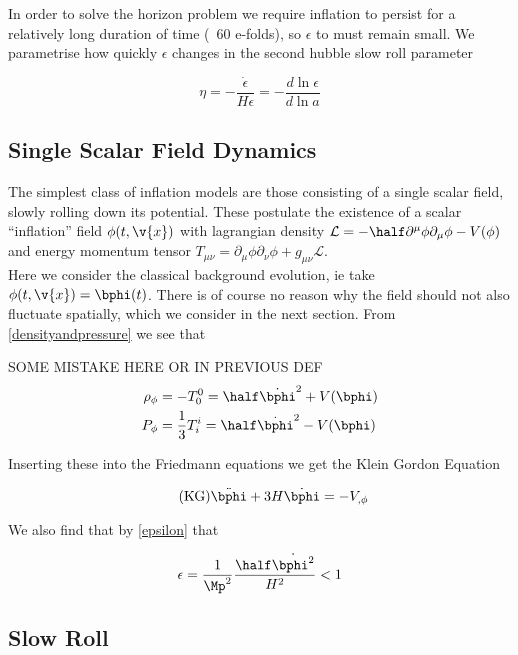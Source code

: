 In order to solve the horizon problem we require inflation to persist for a relatively long duration of time (~60 e-folds), so $\epsilon$ to must remain small. We parametrise how quickly $\epsilon$ changes in the second hubble slow roll parameter 

\begin{equation}
\eta = -\frac{\dot{\epsilon}}{H\epsilon} = -\frac{d\ln{\epsilon}}{d\ln{a}}
\end{equation}

\subsection{Single Scalar Field Dynamics}

The simplest class of inflation models are those consisting of a single scalar field, slowly rolling down its potential. These postulate the existence of a scalar ``inflation'' field $\phi(t,\v{x})$ with lagrangian density $\mathcal{L} = -\half \partial^\mu \phi \partial_\mu \phi - V(\phi)$ and energy momentum tensor $T_{\mu\nu}= \partial_\mu \phi \partial_\nu \phi + g_{\mu\nu}\mathcal{L}$. \\

Here we consider the classical background evolution, ie take $\phi(t,\v{x}) = \bphi(t)$. There is of course no reason why the field should not also fluctuate spatially, which we consider in the next section. From \ref{densityandpressure} we see that 


SOME MISTAKE HERE OR IN PREVIOUS DEF
\begin{equation}\begin{split}
\rho_\phi &=-T^0_0 = \half \dot{\bphi}^2+V(\bphi)\\
P_\phi&=\frac{1}{3}T^i_i = \half \dot{\bphi}^2-V(\bphi)
\end{split}\end{equation}

Inserting these into the Friedmann equations we get the Klein Gordon Equation

\begin{equation}
\tag{KG}
\label{KG}
\ddot{\bphi}+3H\dot{\bphi}=-V_{,\phi}
\end{equation}

We also find that by \ref{epsilon} that 

\begin{equation}
\epsilon = \frac{1}{\Mp^2}\frac{\half\dot{\bphi^2}}{H^2} < 1
\end{equation}

\subsection{Slow Roll}

